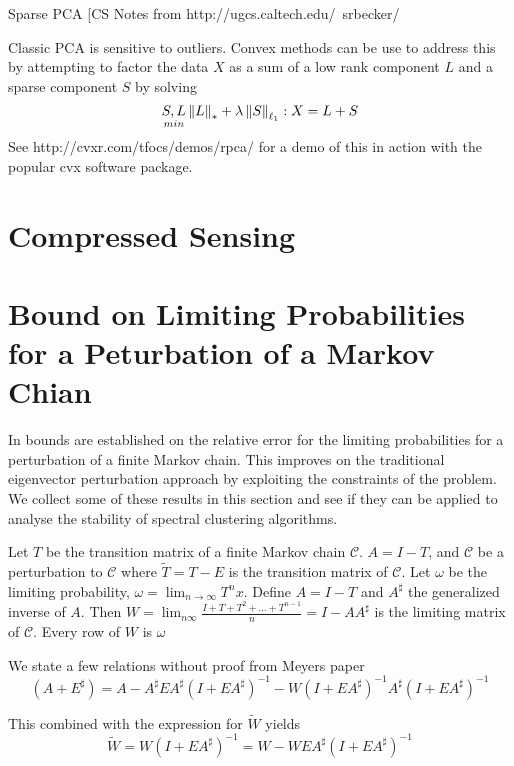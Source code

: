 Sparse PCA
[CS Notes from http://ugcs.caltech.edu/~srbecker/

Classic PCA is sensitive to outliers.  Convex methods can be use to address this by attempting to factor the data $X$ as a sum of a low rank component $L$ and a sparse component $S$ by solving
\begin{equation*}
\underset{min}{S,L} \left\Vert L\right\Vert_* + \lambda \left\Vert S\right\Vert_{\ell_1}  : X=L+S
\end{equation*}
See http://cvxr.com/tfocs/demos/rpca/ for a demo of this in action with the popular cvx software package.



\section{Compressed Sensing}


\section{Bound on Limiting Probabilities for a Peturbation of a Markov Chian}
In \cite{meyer1980condition} bounds are established on the relative error for the limiting probabilities for a perturbation of a finite Markov chain.  This improves on the traditional eigenvector perturbation approach by exploiting the constraints of the problem.  We collect some of these results in this section and see if they can be applied to analyse the stability of spectral clustering algorithms.

Let $T$ be the transition matrix of a finite Markov chain $\mathcal{C}$. $A=I-T$, and $\mathcal{C}$ be a perturbation to $\mathcal{C}$ where $\tilde{T} =T-E$ is the transition matrix of  $\mathcal{C}$. Let $\omega$ be the limiting probability, $\omega = \lim_{n \to \infty} T^n x$. Define $A=I-T$ and $A^\sharp$ the generalized inverse of $A$. Then $W=\lim_{n  \infty} \frac{I+T+T^2 + \ldots + T^{n-1}}{n} = I-A A^\sharp$ is the limiting matrix of $\mathcal{C}$.  Every row of $W$ is $\omega$

We state a few relations without proof from Meyers paper
\begin{equation}
(A+E^\sharp)=A - A^\sharp E A^\sharp (I+ E A^\sharp)^{-1} - W(I+E A^\sharp)^{-1} A^\sharp (I+E A^\sharp)^{-1}
\end{equation}

This combined with the expression for $\tilde{W}$ yields
\begin{equation}
\tilde{W} = W(I+E A^\sharp)^{-1} = W - W E A^\sharp (I + E A^\sharp)^{-1}
\end{equation}

